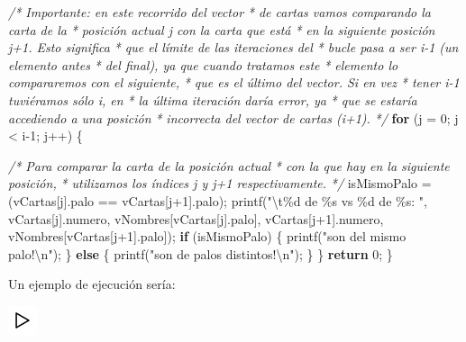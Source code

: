 \documentclass[
]{book}
\newenvironment{Shaded}{\begin{snugshade}}{\end{snugshade}}
\newcommand{\CommentTok}[1]{\textcolor[rgb]{0.56,0.35,0.01}{\textit{#1}}}
\newcommand{\ControlFlowTok}[1]{\textcolor[rgb]{0.13,0.29,0.53}{\textbf{#1}}}
\newcommand{\DecValTok}[1]{\textcolor[rgb]{0.00,0.00,0.81}{#1}}
\newcommand{\NormalTok}[1]{#1}
\newcommand{\SpecialCharTok}[1]{\textcolor[rgb]{0.00,0.00,0.00}{#1}}
\newcommand{\StringTok}[1]{\textcolor[rgb]{0.31,0.60,0.02}{#1}}
\begin{document}
\begin{Shaded}
\begin{Highlighting}[]
    \CommentTok{/* Importante: en este recorrido del vector}
\CommentTok{     * de cartas vamos comparando la carta de la}
\CommentTok{     * posición actual j con la carta que está}
\CommentTok{     * en la siguiente posición j+1. Esto significa}
\CommentTok{     * que el límite de las iteraciones del}
\CommentTok{     * bucle pasa a ser i{-}1 (un elemento antes}
\CommentTok{     * del final), ya que cuando tratamos este}
\CommentTok{     * elemento lo compararemos con el siguiente,}
\CommentTok{     * que es el último del vector. Si en vez}
\CommentTok{     * tener i{-}1 tuviéramos sólo i, en}
\CommentTok{     * la última iteración daría error, ya}
\CommentTok{     * que se estaría accediendo a una posición}
\CommentTok{     * incorrecta del vector de cartas (i+1).}
\CommentTok{     */}
    \ControlFlowTok{for}\NormalTok{ (j = }\DecValTok{0}\NormalTok{; j \textless{} i{-}}\DecValTok{1}\NormalTok{; j++) \{}
        
        \CommentTok{/* Para comparar la carta de la posición actual}
\CommentTok{         * con la que hay en la siguiente posición,}
\CommentTok{         * utilizamos los índices j y j+1 respectivamente.}
\CommentTok{         */}
\NormalTok{        isMismoPalo = (vCartas[j].palo == vCartas[j+}\DecValTok{1}\NormalTok{].palo);}
\NormalTok{        printf(}\StringTok{"}\SpecialCharTok{\textbackslash{}t}\StringTok{\%d de \%s vs \%d de \%s: "}\NormalTok{, vCartas[j].numero, vNombres[vCartas[j].palo], vCartas[j+}\DecValTok{1}\NormalTok{].numero, vNombres[vCartas[j+}\DecValTok{1}\NormalTok{].palo]);}
        \ControlFlowTok{if}\NormalTok{ (isMismoPalo) \{}
\NormalTok{            printf(}\StringTok{"son del mismo palo!}\SpecialCharTok{\textbackslash{}n}\StringTok{"}\NormalTok{);}
\NormalTok{        \} }\ControlFlowTok{else}\NormalTok{ \{}
\NormalTok{            printf(}\StringTok{"son de palos distintos!}\SpecialCharTok{\textbackslash{}n}\StringTok{"}\NormalTok{);}
\NormalTok{        \}}
\NormalTok{    \}}
    \ControlFlowTok{return} \DecValTok{0}\NormalTok{;}
\NormalTok{\}}
\end{Highlighting}
\end{Shaded}

Un ejemplo de ejecución sería:

\includegraphics{./img/play.png}
\end{document}
